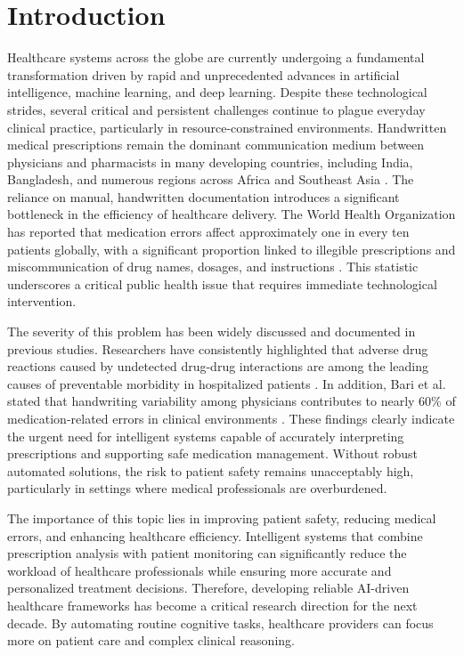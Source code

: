 \documentclass[conference]{IEEEtran}
\begin{document}
\section{Introduction}
\label{sec:introduction}
Healthcare systems across the globe are currently undergoing a fundamental transformation driven by rapid and unprecedented advances in artificial intelligence, machine learning, and deep learning. Despite these technological strides, several critical and persistent challenges continue to plague everyday clinical practice, particularly in resource-constrained environments. Handwritten medical prescriptions remain the dominant communication medium between physicians and pharmacists in many developing countries, including India, Bangladesh, and numerous regions across Africa and Southeast Asia \cite{chandra2019prescription,vimbi2024brain}. The reliance on manual, handwritten documentation introduces a significant bottleneck in the efficiency of healthcare delivery. The World Health Organization has reported that medication errors affect approximately one in every ten patients globally, with a significant proportion linked to illegible prescriptions and miscommunication of drug names, dosages, and instructions \cite{sharjeel2025ai}. This statistic underscores a critical public health issue that requires immediate technological intervention.

The severity of this problem has been widely discussed and documented in previous studies. Researchers have consistently highlighted that adverse drug reactions caused by undetected drug-drug interactions are among the leading causes of preventable morbidity in hospitalized patients \cite{babu2024aidriven}. In addition, Bari et al. stated that handwriting variability among physicians contributes to nearly 60\% of medication-related errors in clinical environments \cite{devi2026endtoend}. These findings clearly indicate the urgent need for intelligent systems capable of accurately interpreting prescriptions and supporting safe medication management. Without robust automated solutions, the risk to patient safety remains unacceptably high, particularly in settings where medical professionals are overburdened.

The importance of this topic lies in improving patient safety, reducing medical errors, and enhancing healthcare efficiency. Intelligent systems that combine prescription analysis with patient monitoring can significantly reduce the workload of healthcare professionals while ensuring more accurate and personalized treatment decisions. Therefore, developing reliable AI-driven healthcare frameworks has become a critical research direction for the next decade. By automating routine cognitive tasks, healthcare providers can focus more on patient care and complex clinical reasoning.
\end{document}
